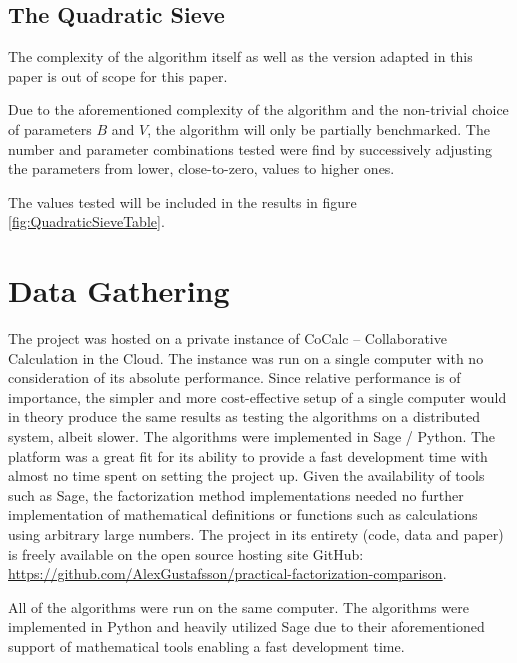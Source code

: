 \subsection{The Quadratic Sieve}

The complexity of the algorithm itself as well as the version adapted in this paper is out of scope for this paper.

Due to the aforementioned complexity of the algorithm and the non-trivial choice of parameters $B$ and $V$, the algorithm will only be partially benchmarked. The number and parameter combinations tested were find by successively adjusting the parameters from lower, close-to-zero, values to higher ones.

The values tested will be included in the results in figure \ref{fig:QuadraticSieveTable}.

\section{Data Gathering}

The project was hosted on a private instance of CoCalc -- Collaborative Calculation in the Cloud. The instance was run on a single computer with no consideration of its absolute performance. Since relative performance is of importance, the simpler and more cost-effective setup of a single computer would in theory produce the same results as testing the algorithms on a distributed system, albeit slower. The algorithms were implemented in Sage / Python. The platform was a great fit for its ability to provide a fast development time with almost no time spent on setting the project up. Given the availability of tools such as Sage, the factorization method implementations needed no further implementation of mathematical definitions or functions such as calculations using arbitrary large numbers. The project in its entirety (code, data and paper) is freely available on the open source hosting site GitHub: \href{https://github.com/AlexGustafsson/practical-factorization-comparison}{https://github.com/AlexGustafsson/practical-factorization-comparison}.

All of the algorithms were run on the same computer. The algorithms were implemented in Python and heavily utilized Sage due to their aforementioned support of mathematical tools enabling a fast development time.

